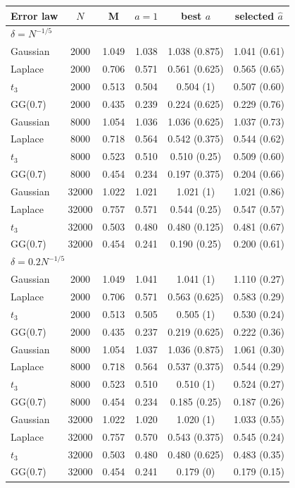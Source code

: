 \begin{tabular}{lccccc}
\toprule
Error law & $N$ & M & $a=1$ & best $a$ & selected $\hat a$ \\
\midrule
\multicolumn{6}{l}{\emph{$\delta=N^{-1/5}$}} \\
Gaussian & 2000 & 1.049 & 1.038 & 1.038 (0.875) & 1.041 (0.61) \\
Laplace & 2000 & 0.706 & 0.571 & 0.561 (0.625) & 0.565 (0.65) \\
$t_3$ & 2000 & 0.513 & 0.504 & 0.504 (1) & 0.507 (0.60) \\
GG(0.7) & 2000 & 0.435 & 0.239 & 0.224 (0.625) & 0.229 (0.76) \\
Gaussian & 8000 & 1.054 & 1.036 & 1.036 (0.625) & 1.037 (0.73) \\
Laplace & 8000 & 0.718 & 0.564 & 0.542 (0.375) & 0.544 (0.62) \\
$t_3$ & 8000 & 0.523 & 0.510 & 0.510 (0.25) & 0.509 (0.60) \\
GG(0.7) & 8000 & 0.454 & 0.234 & 0.197 (0.375) & 0.204 (0.66) \\
Gaussian & 32000 & 1.022 & 1.021 & 1.021 (1) & 1.021 (0.86) \\
Laplace & 32000 & 0.757 & 0.571 & 0.544 (0.25) & 0.547 (0.57) \\
$t_3$ & 32000 & 0.503 & 0.480 & 0.480 (0.125) & 0.481 (0.67) \\
GG(0.7) & 32000 & 0.454 & 0.241 & 0.190 (0.25) & 0.200 (0.61) \\
\multicolumn{6}{l}{\emph{$\delta=0.2N^{-1/5}$}} \\
Gaussian & 2000 & 1.049 & 1.041 & 1.041 (1) & 1.110 (0.27) \\
Laplace & 2000 & 0.706 & 0.571 & 0.563 (0.625) & 0.583 (0.29) \\
$t_3$ & 2000 & 0.513 & 0.505 & 0.505 (1) & 0.530 (0.24) \\
GG(0.7) & 2000 & 0.435 & 0.237 & 0.219 (0.625) & 0.222 (0.36) \\
Gaussian & 8000 & 1.054 & 1.037 & 1.036 (0.875) & 1.061 (0.30) \\
Laplace & 8000 & 0.718 & 0.564 & 0.537 (0.375) & 0.544 (0.29) \\
$t_3$ & 8000 & 0.523 & 0.510 & 0.510 (1) & 0.524 (0.27) \\
GG(0.7) & 8000 & 0.454 & 0.234 & 0.185 (0.25) & 0.187 (0.26) \\
Gaussian & 32000 & 1.022 & 1.020 & 1.020 (1) & 1.033 (0.55) \\
Laplace & 32000 & 0.757 & 0.570 & 0.543 (0.375) & 0.545 (0.24) \\
$t_3$ & 32000 & 0.503 & 0.480 & 0.480 (0.625) & 0.483 (0.35) \\
GG(0.7) & 32000 & 0.454 & 0.241 & 0.179 (0) & 0.179 (0.15) \\
\bottomrule
\end{tabular}
